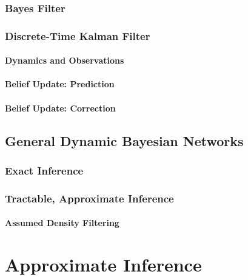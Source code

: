 		\subsection{Bayes Filter} %

		\subsection{Discrete-Time Kalman Filter} %

			\subsubsection{Dynamics and Observations} %

			\subsubsection{Belief Update: Prediction} %

			\subsubsection{Belief Update: Correction} %

	\section{General Dynamic Bayesian Networks} %

		\subsection{Exact Inference} %

		\subsection{Tractable, Approximate Inference} %

			\subsubsection{Assumed Density Filtering} %

\chapter{Approximate Inference} %
	\label{c:approxInference}

